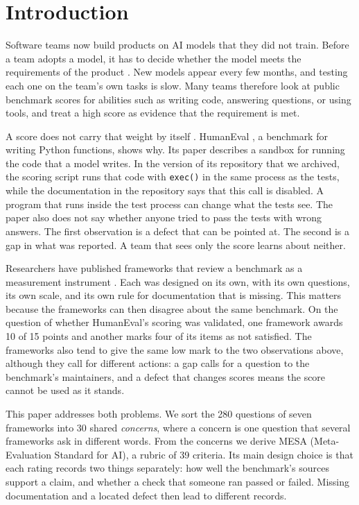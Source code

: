 \documentclass[runningheads]{llncs}
\begin{document}
\section{Introduction}
\label{sec:introduction}

Software teams now build products on AI models that they did not train. Before a team adopts a model, it has to decide whether the model meets the requirements of the product \cite{habiba_re4ai_maturity_2024}. New models appear every few months, and testing each one on the team's own tasks is slow. Many teams therefore look at public benchmark scores for abilities such as writing code, answering questions, or using tools, and treat a high score as evidence that the requirement is met.

A score does not carry that weight by itself \cite{singh_leaderboard_illusion,alonso_church_sigir}. HumanEval \cite{chen_codex_humaneval_2021,human_eval_repository}, a benchmark for writing Python functions, shows why. Its paper describes a sandbox for running the code that a model writes. In the version of its repository that we archived, the scoring script runs that code with \texttt{exec()} in the same process as the tests, while the documentation in the repository says that this call is disabled. A program that runs inside the test process can change what the tests see. The paper also does not say whether anyone tried to pass the tests with wrong answers. The first observation is a defect that can be pointed at. The second is a gap in what was reported. A team that sees only the score learns about neither.

Researchers have published frameworks that review a benchmark as a measurement instrument \cite{reuel_betterbench,liu_ecbd_2024,san_joaquin_scorecard_2026,cao_how2bench_2025,zhu_agentic_benchmark_checklist_2025,corona_benchmark_caliper_2026,cohn_hernandez_orallo_oecd_2023}. Each was designed on its own, with its own questions, its own scale, and its own rule for documentation that is missing. This matters because the frameworks can then disagree about the same benchmark. On the question of whether HumanEval's scoring was validated, one framework awards 10 of 15 points and another marks four of its items as not satisfied. The frameworks also tend to give the same low mark to the two observations above, although they call for different actions: a gap calls for a question to the benchmark's maintainers, and a defect that changes scores means the score cannot be used as it stands.

This paper addresses both problems. We sort the 280 questions of seven frameworks into 30 shared \emph{concerns}, where a concern is one question that several frameworks ask in different words. From the concerns we derive MESA (Meta-Evaluation Standard for AI), a rubric of 39 criteria. Its main design choice is that each rating records two things separately: how well the benchmark's sources support a claim, and whether a check that someone ran passed or failed. Missing documentation and a located defect then lead to different records.
\end{document}
